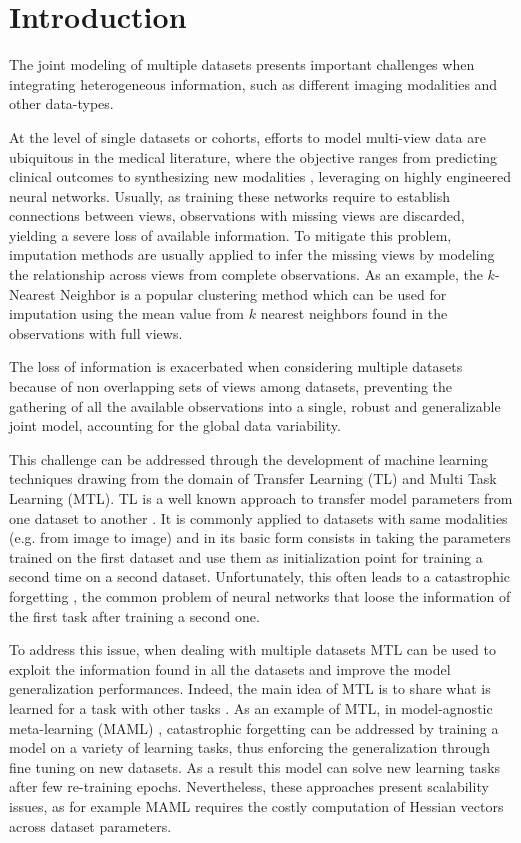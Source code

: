 \section{Introduction}

The joint modeling of multiple datasets presents important challenges when integrating heterogeneous information, such as different imaging modalities and other data-types.

At the level of single datasets or cohorts, efforts to model multi-view data are ubiquitous in the medical literature, where the objective ranges from predicting clinical outcomes \citep{Chen2019} to synthesizing new modalities \citep{Zhou2020, Wei2019}, leveraging on highly engineered neural networks.
Usually, as training these networks require to establish connections between views, observations with missing views are discarded, yielding a severe loss of available information.
To mitigate this problem, imputation methods are usually applied to infer the missing views by modeling the relationship across views from complete observations.
As an example, the $k$-Nearest Neighbor is a popular clustering method which can be used for imputation using the mean value from $k$ nearest neighbors found in the observations with full views.

The loss of information is exacerbated when considering multiple datasets because of non overlapping sets of views among datasets, preventing the gathering of all the available observations into a single, robust and generalizable joint model, accounting for the global data variability.

This challenge can be addressed through the development of machine learning techniques drawing from the domain of Transfer Learning (TL) and Multi Task Learning (MTL).
TL is a well known approach to transfer model parameters from one dataset to another \citep{TL}.
It is commonly applied to datasets with same modalities (e.g. from image to image) and in its basic form consists in taking the parameters trained on the first dataset and use them as initialization point for training a second time on a second dataset.
Unfortunately, this often leads to a catastrophic forgetting \citep{CatastroficForgetting}, the common problem of neural networks that loose the information of the first task after training a second one.

To address this issue, when dealing with multiple datasets MTL can be used to exploit the information found in all the datasets and improve the model generalization performances.
Indeed, the main idea of MTL is to share what is learned for a task with other tasks \citep{Caruana1998, Dorado-Moreno2020}.
As an example of MTL, in model-agnostic meta-learning (MAML) \citep{MAML1}, catastrophic forgetting can be addressed by training a model on a variety of learning tasks, thus enforcing the generalization through fine tuning on new datasets.
As a result this model can solve new learning tasks after few re-training epochs.
Nevertheless, these approaches present scalability issues, as for example MAML requires the costly computation of Hessian vectors across dataset parameters.

